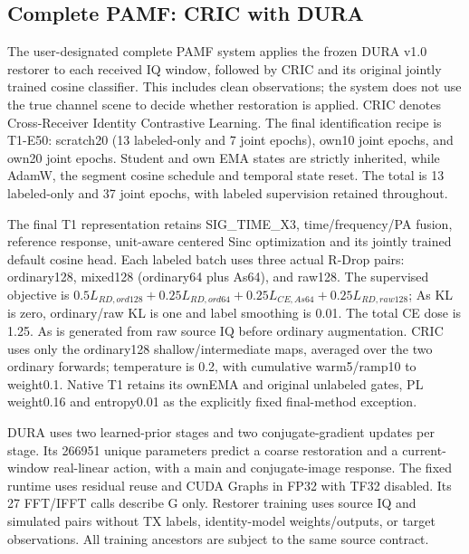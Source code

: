 \subsection{Complete PAMF: CRIC with DURA}
\label{sec:cric-dura}
The user-designated complete PAMF system applies the frozen DURA v1.0 restorer to each received IQ window, followed by CRIC and its original jointly trained cosine classifier. This includes clean observations; the system does not use the true channel scene to decide whether restoration is applied. CRIC denotes Cross-Receiver Identity Contrastive Learning. The final identification recipe is T1-E50: scratch20 (13 labeled-only and 7 joint epochs), own10 joint epochs, and own20 joint epochs. Student and own EMA states are strictly inherited, while AdamW, the segment cosine schedule and temporal state reset. The total is 13 labeled-only and 37 joint epochs, with labeled supervision retained throughout.

The final T1 representation retains SIG\_TIME\_X3, time/frequency/PA fusion, reference response, unit-aware centered Sinc optimization and its jointly trained default cosine head. Each labeled batch uses three actual R-Drop pairs: ordinary128, mixed128 (ordinary64 plus As64), and raw128. The supervised objective is $0.5L_{RD,ord128}+0.25L_{RD,ord64}+0.25L_{CE,As64}+0.25L_{RD,raw128}$; As KL is zero, ordinary/raw KL is one and label smoothing is 0.01. The total CE dose is 1.25. As is generated from raw source IQ before ordinary augmentation. CRIC uses only the ordinary128 shallow/intermediate maps, averaged over the two ordinary forwards; temperature is 0.2, with cumulative warm5/ramp10 to weight0.1. Native T1 retains its ownEMA and original unlabeled gates, PL weight0.16 and entropy0.01 as the explicitly fixed final-method exception.

DURA uses two learned-prior stages and two conjugate-gradient updates per stage. Its 266951 unique parameters predict a coarse restoration and a current-window real-linear action, with a main and conjugate-image response. The fixed runtime uses residual reuse and CUDA Graphs in FP32 with TF32 disabled. Its 27 FFT/IFFT calls describe G only. Restorer training uses source IQ and simulated pairs without TX labels, identity-model weights/outputs, or target observations. All training ancestors are subject to the same source contract.



